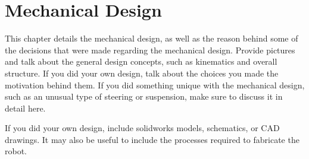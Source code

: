 
\chapter{Mechanical Design}
\label{chap:mechdesign}

This chapter details the mechanical design, as well as the reason behind some of the decisions that were made regarding the mechanical design. Provide pictures and talk about the general design concepts, such as kinematics and overall structure. If you did your own design, talk about the choices you made the motivation behind them. If you did something unique with the mechanical design, such as an unusual type of steering or suspension, make sure to discuss it in detail here.

If you did your own design, include solidworks models, schematics, or CAD drawings. It may also be useful to include the processes required to fabricate the robot.